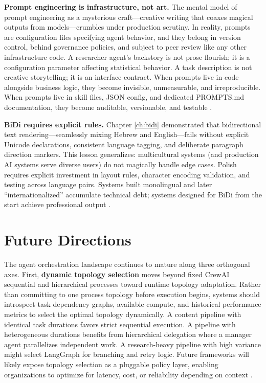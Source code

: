 \textbf{Prompt engineering is infrastructure, not art.} The mental model of prompt engineering as a mysterious craft—creative writing that coaxes magical outputs from models—crumbles under production scrutiny. In reality, prompts are configuration files specifying agent behavior, and they belong in version control, behind governance policies, and subject to peer review like any other infrastructure code. A researcher agent's backstory is not prose flourish; it is a configuration parameter affecting statistical behavior. A task description is not creative storytelling; it is an interface contract. When prompts live in code alongside business logic, they become invisible, unmeasurable, and irreproducible. When prompts live in skill files, JSON config, and dedicated PROMPTS.md documentation, they become auditable, versionable, and testable \cite{LangChain2024a}.

\textbf{BiDi requires explicit rules.} Chapter \ref{ch:bidi} demonstrated that bidirectional text rendering—seamlessly mixing Hebrew and English—fails without explicit Unicode declarations, consistent language tagging, and deliberate paragraph direction markers. This lesson generalizes: multicultural systems (and production AI systems serve diverse users) do not magically handle edge cases. Polish requires explicit investment in layout rules, character encoding validation, and testing across language pairs. Systems built monolingual and later ``internationalized'' accumulate technical debt; systems designed for BiDi from the start achieve professional output \cite{Polyglossia2023}.

\section{Future Directions}\label{sec:future}

The agent orchestration landscape continues to mature along three orthogonal axes. First, \textbf{dynamic topology selection} moves beyond fixed CrewAI sequential and hierarchical processes toward runtime topology adaptation. Rather than committing to one process topology before execution begins, systems should introspect task dependency graphs, available compute, and historical performance metrics to select the optimal topology dynamically. A content pipeline with identical task durations favors strict sequential execution. A pipeline with heterogeneous durations benefits from hierarchical delegation where a manager agent parallelizes independent work. A research-heavy pipeline with high variance might select LangGraph for branching and retry logic. Future frameworks will likely expose topology selection as a pluggable policy layer, enabling organizations to optimize for latency, cost, or reliability depending on context \cite{Wang2023}.


